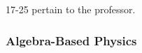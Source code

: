 \documentclass[../../main.tex]{subfiles}
\begin{document}
17-25 pertain to the professor.  

\subsubsection{Algebra-Based Physics}
\end{document}

